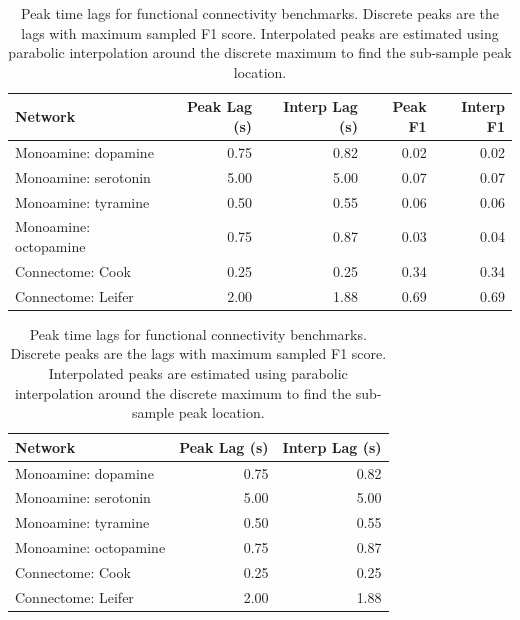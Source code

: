 \begin{table}
\centering
\caption{Peak time lags for functional connectivity benchmarks. Discrete peaks are the lags with maximum sampled F1 score. Interpolated peaks are estimated using parabolic interpolation around the discrete maximum to find the sub-sample peak location.}
\label{tab:peak_lags}
\begin{tabular}{lrrrr}
\toprule
              Network &  Peak Lag (s) &  Interp Lag (s) &  Peak F1 &  Interp F1 \\
\midrule
  Monoamine: dopamine &          0.75 &            0.82 &     0.02 &       0.02 \\
 Monoamine: serotonin &          5.00 &            5.00 &     0.07 &       0.07 \\
  Monoamine: tyramine &          0.50 &            0.55 &     0.06 &       0.06 \\
Monoamine: octopamine &          0.75 &            0.87 &     0.03 &       0.04 \\
     Connectome: Cook &          0.25 &            0.25 &     0.34 &       0.34 \\
   Connectome: Leifer &          2.00 &            1.88 &     0.69 &       0.69 \\
\bottomrule
\end{tabular}
\end{table}


\begin{table}
\centering
\caption{Peak time lags for functional connectivity benchmarks. Discrete peaks are the lags with maximum sampled F1 score. Interpolated peaks are estimated using parabolic interpolation around the discrete maximum to find the sub-sample peak location.}
\label{tab:peak_lags}
\begin{tabular}{lrr}
\toprule
              Network &  Peak Lag (s) &  Interp Lag (s) \\
\midrule
  Monoamine: dopamine &          0.75 &            0.82 \\
 Monoamine: serotonin &          5.00 &            5.00 \\
  Monoamine: tyramine &          0.50 &            0.55 \\
Monoamine: octopamine &          0.75 &            0.87 \\
     Connectome: Cook &          0.25 &            0.25 \\
   Connectome: Leifer &          2.00 &            1.88 \\
\bottomrule
\end{tabular}
\end{table}
